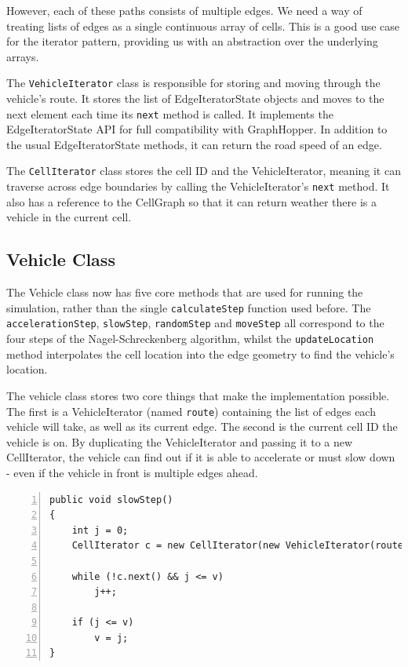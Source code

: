 \documentclass[ %
                    author={Alexander Hill},
                supervisor={Dr. Benjamin Sach},
                    degree={MEng},
                     title={MARMOSET},
                  subtitle={Multi-Agent Route Management using Online Simulation for Efficient Transportation},
                      type={research},
                      year={2016} ]{dissertation}
\begin{document}
However, each of these paths consists of multiple edges. We need a way of
treating lists of edges as a single continuous array of cells. This is a good
use case for the iterator pattern, providing us with an abstraction over the
underlying arrays.

The \texttt{VehicleIterator} class is responsible for storing and moving through
the vehicle's route. It stores the list of EdgeIteratorState objects and moves
to the next element each time its \texttt{next} method is called. It implements
the EdgeIteratorState API for full compatibility with GraphHopper. In addition
to the usual EdgeIteratorState methods, it can return the road speed of an edge.

The \texttt{CellIterator} class stores the cell ID and the VehicleIterator,
meaning it can traverse across edge boundaries by calling the VehicleIterator's
\texttt{next} method. It also has a reference to the CellGraph so that it can
return weather there is a vehicle in the current cell.


\subsection{Vehicle Class}

The Vehicle class now has five core methods that are used for running the
simulation, rather than the single \texttt{calculateStep} function used before.
The \texttt{accelerationStep}, \texttt{slowStep}, \texttt{randomStep} and
\texttt{moveStep} all correspond to the four steps of the Nagel-Schreckenberg
algorithm, whilst the \texttt{updateLocation} method interpolates the cell
location into the edge geometry to find the vehicle's location.

The vehicle class stores two core things that make the implementation possible.
The first is a VehicleIterator (named \texttt{route}) containing the list of
edges each vehicle will take, as well as its current edge. The second is the
current cell ID the vehicle is on. By duplicating the VehicleIterator and
passing it to a new CellIterator, the vehicle can find out if it is able to
accelerate or must slow down - even if the vehicle in front is multiple edges
ahead.

\begin{minipage}{\linewidth}
\begin{lstlisting}[caption={The \texttt{slowStep} implementation making use of the CellIterator},
                    label=lst:slowStep, numbers=left]
public void slowStep()
{
    int j = 0;
    CellIterator c = new CellIterator(new VehicleIterator(route), cg, cellId);

    while (!c.next() && j <= v)
        j++;

    if (j <= v)
        v = j;
}
\end{lstlisting}
\end{minipage}
\end{document}

